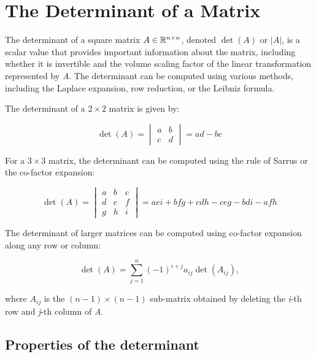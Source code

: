 \newpage
\section{The Determinant of a Matrix}

The determinant of a square matrix \(A \in \mathbb{R}^{n \times n}\), denoted \(\det(A)\) or \(|A|\), is a 
scalar value that provides important information about the matrix, including whether it is 
invertible and the volume scaling factor of the linear transformation represented by \emph{A}.
The determinant can be computed using various methods, including the Laplace 
expansion, row reduction, or the Leibniz formula.
\vspace{\baselineskip}

The determinant of a \(2 \times 2\) matrix is given by:

\begin{equation*}
\det(A) =
\begin{vmatrix}
a & b \\
c & d
\end{vmatrix}
= ad - bc
\end{equation*}

For a \(3 \times 3\) matrix, the determinant can be computed using the rule of Sarrus or the co-factor expansion:

\begin{equation*}
\det(A) =
\begin{vmatrix}
a & b & c \\
d & e & f \\
g & h & i
\end{vmatrix}
= aei + bfg + cdh - ceg - bdi - afh
\end{equation*}

The determinant of larger matrices can be computed using co-factor expansion along any row or column:

\begin{equation*}
\det(A) = \sum_{j=1}^{n} {(-1)}^{i+j} a_{ij} \det(A_{ij}),
\end{equation*}

where \(A_{ij}\) is the \((n-1) \times (n-1)\) sub-matrix obtained by deleting the \emph{i}-th row and \emph{j}-th column of \emph{A}.

\subsection{Properties of the determinant}

